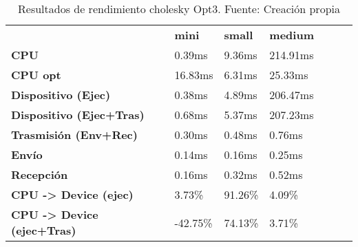 \begin{table}[H]
    \centering
    \begin{tabular}{lllllll}
    \rowcolor[HTML]{DAE8FC} \ &  \textbf{mini} &  \textbf{	small} &  \textbf{	medium} \\
    \cellcolor[HTML]{DAE8FC} \textbf{CPU} & 0.39ms & 	9.36ms & 	214.91ms \\
    \rowcolor[HTML]{EFEFEF} \cellcolor[HTML]{DAE8FC} \textbf{CPU opt} & 16.83ms & 	6.31ms & 	25.33ms \\
    \cellcolor[HTML]{DAE8FC} \textbf{Dispositivo (Ejec)} & 0.38ms & 	4.89ms & 	206.47ms \\
    \rowcolor[HTML]{EFEFEF} \cellcolor[HTML]{DAE8FC} \textbf{Dispositivo (Ejec+Tras)} & 0.68ms & 	5.37ms & 	207.23ms \\
    \cellcolor[HTML]{DAE8FC} \textbf{Trasmisión (Env+Rec)} & 0.30ms & 	0.48ms & 	0.76ms \\
    \rowcolor[HTML]{EFEFEF} \cellcolor[HTML]{DAE8FC} \textbf{Envío} & 0.14ms & 	0.16ms & 	0.25ms \\
    \cellcolor[HTML]{DAE8FC} \textbf{Recepción} & 0.16ms & 	0.32ms & 	0.52ms \\
    \rowcolor[HTML]{EFEFEF} \cellcolor[HTML]{DAE8FC} \textbf{CPU -> Device (ejec)} & 3.73\% & 	91.26\% & 	4.09\% \\
    \cellcolor[HTML]{DAE8FC} \textbf{CPU -> Device (ejec+Tras)} & -42.75\% & 	74.13\% & 	3.71\% \\
    \end{tabular}
    \caption[Resultados de rendimiento cholesky Opt3]{{Resultados de rendimiento cholesky Opt3. Fuente: Creación propia}}
    \label{table_test_cholesky_Opt3_hw_performanceResults}
\end{table}